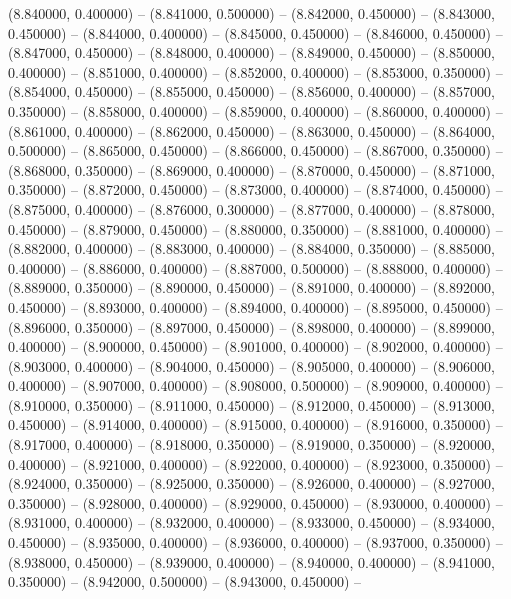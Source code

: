(8.840000, 0.400000) -- 
(8.841000, 0.500000) -- 
(8.842000, 0.450000) -- 
(8.843000, 0.450000) -- 
(8.844000, 0.400000) -- 
(8.845000, 0.450000) -- 
(8.846000, 0.450000) -- 
(8.847000, 0.450000) -- 
(8.848000, 0.400000) -- 
(8.849000, 0.450000) -- 
(8.850000, 0.400000) -- 
(8.851000, 0.400000) -- 
(8.852000, 0.400000) -- 
(8.853000, 0.350000) -- 
(8.854000, 0.450000) -- 
(8.855000, 0.450000) -- 
(8.856000, 0.400000) -- 
(8.857000, 0.350000) -- 
(8.858000, 0.400000) -- 
(8.859000, 0.400000) -- 
(8.860000, 0.400000) -- 
(8.861000, 0.400000) -- 
(8.862000, 0.450000) -- 
(8.863000, 0.450000) -- 
(8.864000, 0.500000) -- 
(8.865000, 0.450000) -- 
(8.866000, 0.450000) -- 
(8.867000, 0.350000) -- 
(8.868000, 0.350000) -- 
(8.869000, 0.400000) -- 
(8.870000, 0.450000) -- 
(8.871000, 0.350000) -- 
(8.872000, 0.450000) -- 
(8.873000, 0.400000) -- 
(8.874000, 0.450000) -- 
(8.875000, 0.400000) -- 
(8.876000, 0.300000) -- 
(8.877000, 0.400000) -- 
(8.878000, 0.450000) -- 
(8.879000, 0.450000) -- 
(8.880000, 0.350000) -- 
(8.881000, 0.400000) -- 
(8.882000, 0.400000) -- 
(8.883000, 0.400000) -- 
(8.884000, 0.350000) -- 
(8.885000, 0.400000) -- 
(8.886000, 0.400000) -- 
(8.887000, 0.500000) -- 
(8.888000, 0.400000) -- 
(8.889000, 0.350000) -- 
(8.890000, 0.450000) -- 
(8.891000, 0.400000) -- 
(8.892000, 0.450000) -- 
(8.893000, 0.400000) -- 
(8.894000, 0.400000) -- 
(8.895000, 0.450000) -- 
(8.896000, 0.350000) -- 
(8.897000, 0.450000) -- 
(8.898000, 0.400000) -- 
(8.899000, 0.400000) -- 
(8.900000, 0.450000) -- 
(8.901000, 0.400000) -- 
(8.902000, 0.400000) -- 
(8.903000, 0.400000) -- 
(8.904000, 0.450000) -- 
(8.905000, 0.400000) -- 
(8.906000, 0.400000) -- 
(8.907000, 0.400000) -- 
(8.908000, 0.500000) -- 
(8.909000, 0.400000) -- 
(8.910000, 0.350000) -- 
(8.911000, 0.450000) -- 
(8.912000, 0.450000) -- 
(8.913000, 0.450000) -- 
(8.914000, 0.400000) -- 
(8.915000, 0.400000) -- 
(8.916000, 0.350000) -- 
(8.917000, 0.400000) -- 
(8.918000, 0.350000) -- 
(8.919000, 0.350000) -- 
(8.920000, 0.400000) -- 
(8.921000, 0.400000) -- 
(8.922000, 0.400000) -- 
(8.923000, 0.350000) -- 
(8.924000, 0.350000) -- 
(8.925000, 0.350000) -- 
(8.926000, 0.400000) -- 
(8.927000, 0.350000) -- 
(8.928000, 0.400000) -- 
(8.929000, 0.450000) -- 
(8.930000, 0.400000) -- 
(8.931000, 0.400000) -- 
(8.932000, 0.400000) -- 
(8.933000, 0.450000) -- 
(8.934000, 0.450000) -- 
(8.935000, 0.400000) -- 
(8.936000, 0.400000) -- 
(8.937000, 0.350000) -- 
(8.938000, 0.450000) -- 
(8.939000, 0.400000) -- 
(8.940000, 0.400000) -- 
(8.941000, 0.350000) -- 
(8.942000, 0.500000) -- 
(8.943000, 0.450000) -- 
